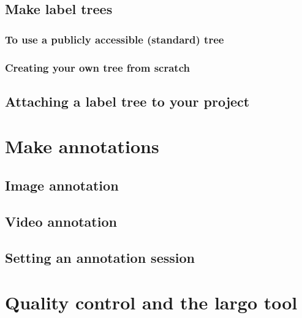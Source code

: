 \documentclass[
  letterpaper,
  DIV=11,
  numbers=noendperiod]{scrartcl}
\begin{document}
\hypertarget{make-label-trees}{%
\subsection{Make label trees}\label{make-label-trees}}

\hypertarget{to-use-a-publicly-accessible-standard-tree}{%
\subsubsection{To use a publicly accessible (standard)
tree}\label{to-use-a-publicly-accessible-standard-tree}}

\hypertarget{creating-your-own-tree-from-scratch}{%
\subsubsection{Creating your own tree from
scratch}\label{creating-your-own-tree-from-scratch}}

\hypertarget{attaching-a-label-tree-to-your-project}{%
\subsection{Attaching a label tree to your
project}\label{attaching-a-label-tree-to-your-project}}

\hypertarget{make-annotations}{%
\section{Make annotations}\label{make-annotations}}

\hypertarget{image-annotation}{%
\subsection{Image annotation}\label{image-annotation}}

\hypertarget{video-annotation}{%
\subsection{Video annotation}\label{video-annotation}}

\hypertarget{setting-an-annotation-session}{%
\subsection{Setting an annotation
session}\label{setting-an-annotation-session}}

\hypertarget{quality-control-and-the-largo-tool}{%
\section{Quality control and the largo
tool}\label{quality-control-and-the-largo-tool}}
\end{document}
